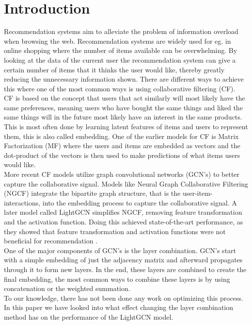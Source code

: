 \section{Introduction}
Recommendation systems aim to alleviate the problem of information overload when browsing the web.
Recommendation systems are widely used for eg. in online shopping where the number of items available can be overwhelming.
By looking at the data of the current user the recommendation system can give a certain number of items that it thinks the user would like, thereby greatly reducing the unnecessary information shown.
There are different ways to achieve this where one of the most common ways is using collaborative filtering (CF).
\\
CF is based on the concept that users that act similarly will most likely have the same preferences, meaning users who have bought the same things and liked the same things will in the future most likely have an interest in the same products.
This is most often done by learning latent features of items and users to represent them, this is also called embedding.
One of the earlier models for CF is Matrix Factorization (MF) where the users and items are embedded as vectors and the dot-product of the vectors is then used to make predictions of what items users would like.
\\
More recent CF models utilize graph convolutional networks (GCN's) to better capture the collaborative signal.
Models like Neural Graph Collaborative Filtering (NGCF) integrate the bipartite graph structure, that is the user-item-interactions, into the embedding process to capture the collaborative signal\cite{NGCF_2019}.
A later model called LightGCN simplifies NGCF, removing feature transformation and the activation function.
Doing this achieved state-of-the-art performance, as they showed that feature transformation and activation functions were not beneficial for recommendation \cite{lightgcn}.
\\
One of the major components of GCN's is the layer combination.
GCN's start with a simple embedding of just the adjacency matrix and afterward propagates through it to form new layers.
In the end, these layers are combined to create the final embedding, the most common ways to combine these layers is by using concatenation or the weighted summation.
\\
To our knowledge, there has not been done any work on optimizing this process.
In this paper we have looked into what effect changing the layer combination method has on the performance of the LightGCN model.
